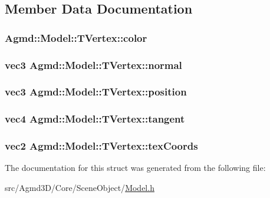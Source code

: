 \subsection{Member Data Documentation}
\hypertarget{struct_agmd_1_1_model_1_1_t_vertex_a86afd772c6607b5cbd1c40b9b26f507f}{
\subsubsection[{color}]{ Agmd\+::\+Model\+::\+T\+Vertex\+::color}}\label{struct_agmd_1_1_model_1_1_t_vertex_a86afd772c6607b5cbd1c40b9b26f507f}
\hypertarget{struct_agmd_1_1_model_1_1_t_vertex_aa900dd5188d95b7817a931a80390e8d2}{
\subsubsection[{normal}]{\setlength{\rightskip}{0pt plus 5cm}vec3 Agmd\+::\+Model\+::\+T\+Vertex\+::normal}}\label{struct_agmd_1_1_model_1_1_t_vertex_aa900dd5188d95b7817a931a80390e8d2}
\hypertarget{struct_agmd_1_1_model_1_1_t_vertex_aaae5a46cf2bf6a247e051e40c821a059}{
\subsubsection[{position}]{\setlength{\rightskip}{0pt plus 5cm}vec3 Agmd\+::\+Model\+::\+T\+Vertex\+::position}}\label{struct_agmd_1_1_model_1_1_t_vertex_aaae5a46cf2bf6a247e051e40c821a059}
\hypertarget{struct_agmd_1_1_model_1_1_t_vertex_a083da43ec7dc4e71588f2b9d071ee845}{
\subsubsection[{tangent}]{\setlength{\rightskip}{0pt plus 5cm}vec4 Agmd\+::\+Model\+::\+T\+Vertex\+::tangent}}\label{struct_agmd_1_1_model_1_1_t_vertex_a083da43ec7dc4e71588f2b9d071ee845}
\hypertarget{struct_agmd_1_1_model_1_1_t_vertex_ad157458197a9dd986a435e355e807be9}{
\subsubsection[{tex\+Coords}]{\setlength{\rightskip}{0pt plus 5cm}vec2 Agmd\+::\+Model\+::\+T\+Vertex\+::tex\+Coords}}\label{struct_agmd_1_1_model_1_1_t_vertex_ad157458197a9dd986a435e355e807be9}


The documentation for this struct was generated from the following file\+:\begin{DoxyCompactItemize}
\item 
src/\+Agmd3\+D/\+Core/\+Scene\+Object/\hyperlink{_model_8h}{Model.\+h}\end{DoxyCompactItemize}
